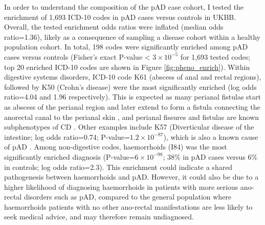   In order to understand the composition of the pAD case cohort, I tested the enrichment of 1,693 ICD-10 codes in pAD cases versus controls in UKBB. Overall, the tested enrichment odds ratios were inflated (median odds ratio=1.36), likely as a consequence of sampling a disease cohort within a healthy population cohort. In total, 198 codes were significantly enriched among pAD cases versus controls (Fisher's exact  P-value < $3\times10^{-5}$ for 1,693 tested codes; top 20 enriched ICD-10 codes are shown in Figure \ref{fig:pheno_enrich}).  Within digestive systems disorders, ICD-10 code K61 (abscess of anal and rectal regions), followed by K50 (Crohn's disease) were the most significantly enriched (log odds ratio=4.04 and 1.96 respectively). This is expected as many perianal fistulas start as abscess of the perianal region and later extend to form a fistula connecting the anorectal canal to the perianal skin \cite{abscess_fist}, and perianal fissures and fistulas are known subphenotypes of CD \cite{Marzo2015-wf}. Other examples include K57 (Diverticular disease of the intestine; log odds ratio=0.74; P-value=$1.2\times10^{-87}$), which is also a known cause of pAD \cite{div_pad}. Among non-digestive codes, haemorrhoids (I84) was the most significantly enriched diagnosis (P-value=$6\times10^{-98}$; 38\% in pAD cases versus 6\% in controls; log odds ratio=2.3). This enrichment could indicate a shared pathogenesis between haemorrhoids and pAD. However, it could also be due to a higher likelihood of diagnosing haemorrhoids in patients with more serious ano-rectal disorders such as pAD, compared to the general population where haemorrhoids patients with no other ano-rectal manifestations are less likely to seek medical advice, and may therefore remain undiagnosed. \\




